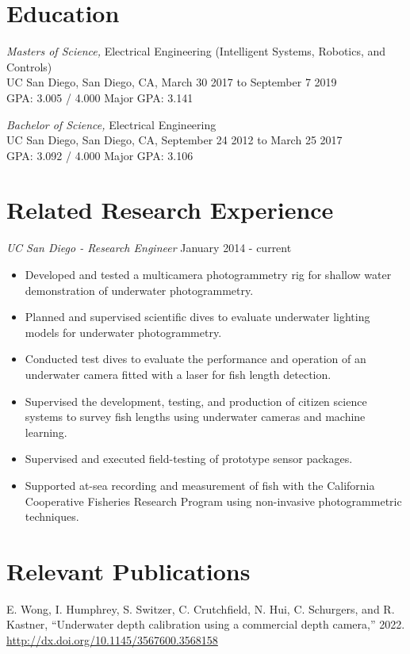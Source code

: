 \documentclass[line,margin]{res}
\begin{document}
\address{9500 Gilman Dr MC0404, La Jolla, CA 92093}
\address{nthui@ucsd.edu, 858.534.9306}
\begin{resume}
    \section{Education}
	{\sl Masters of Science,} Electrical Engineering (Intelligent Systems, Robotics, and Controls)\\
	UC San Diego, San Diego, CA, March 30 2017 to September 7 2019\\
	GPA: 3.005 / 4.000
	Major GPA: 3.141

    
	{\sl Bachelor of Science,} Electrical Engineering \\
	UC San Diego, San Diego, CA, September 24 2012 to March 25 2017\\
	GPA: 3.092 / 4.000
	Major GPA: 3.106

    \section{Related Research Experience}
    {\sl UC San Diego - Research Engineer} \hfill January 2014 - current
    \begin{itemize}
		\item Developed and tested a multicamera photogrammetry rig for shallow water demonstration of underwater photogrammetry.
        \item Planned and supervised scientific dives to evaluate underwater lighting models for underwater photogrammetry.
        \item Conducted test dives to evaluate the performance and operation of an underwater camera fitted with a laser for fish length detection.
        \item Supervised the development, testing, and production of citizen science systems to survey fish lengths using underwater cameras and machine learning.
        \item Supervised and executed field-testing of prototype sensor packages.
        \item Supported at-sea recording and measurement of fish with the California Cooperative Fisheries Research Program using non-invasive photogrammetric techniques.
    \end{itemize}

    \section{Relevant Publications}
    E. Wong, I. Humphrey, S. Switzer, C. Crutchfield, N. Hui, C. Schurgers, and R. Kastner, “Underwater depth calibration using a commercial depth camera,” 2022. \url{http://dx.doi.org/10.1145/3567600.3568158}


\end{resume}
\end{document}
